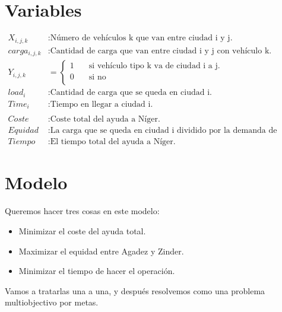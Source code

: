 \documentclass[]{article}
\begin{document}
\section{Variables}
\begin{align*}
		X_{i,j,k} &: \text{Número de vehículos k que van entre ciudad i y j.}\\
		carga_{i,j,k} &: \text{Cantidad de carga que van entre ciudad i y j con vehículo k.}\\
		Y_{i,j,k} &=
		\begin{cases}
		1 & \quad \text{si vehículo tipo k va de ciudad i a j.} \\
		0 & \quad \text{si no}\\
		\end{cases}\\
		load_i &: \text{Cantidad de carga que se queda en ciudad i.}\\
		Time_i &: \text{Tiempo en llegar a ciudad i.}\\ \\
		Coste &: \text{Coste total del ayuda a Níger.}\\
		Equidad &: \text{La carga que se queda en ciudad i dividido por la demanda de ciudad i.}\\
		Tiempo &: \text{El tiempo total del ayuda a Níger.}
\end{align*}

\section{Modelo}
Queremos hacer tres cosas en este modelo:
\begin{itemize}
	\item Minimizar el coste del ayuda total.
	\item Maximizar el equidad entre Agadez y Zinder.
	\item Minimizar el tiempo de hacer el operación.
\end{itemize}
Vamos a tratarlas una a una, y después resolvemos como una problema multiobjectivo por metas.
\end{document}
